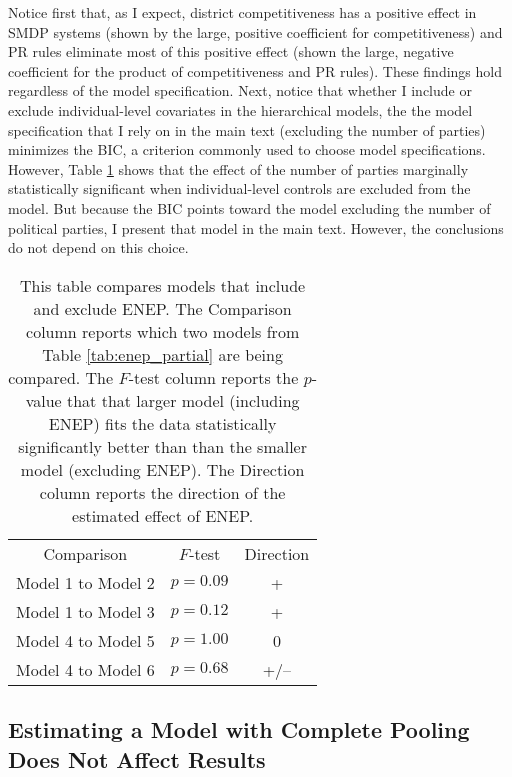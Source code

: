 \documentclass[12pt]{article}
\begin{document}
\begin{appendix}
Notice first that, as I expect, district competitiveness has a positive effect in SMDP systems (shown by the large, positive coefficient for competitiveness) and PR rules eliminate most of this positive effect (shown the large, negative coefficient for the product of competitiveness and PR rules). These findings hold regardless of the model specification. Next, notice that whether I include or exclude individual-level covariates in the hierarchical  models, the the model specification that I rely on in the main text (excluding the number of parties) minimizes the BIC, a criterion commonly used to choose model specifications. However, Table \ref{tab:F_partial} shows that the effect of the number of parties marginally statistically significant when individual-level controls are excluded from the model. But because the BIC points toward the model excluding the number of political parties, I present that model in the main text. However, the conclusions do not depend on this choice.



 
 \begin{table}[h!]
 \begin{center}
 \begin{tabular}{c c c}
 Comparison & $F$-test & Direction \\
 Model 1 to Model 2 & $p = 0.09$ & + \\
 Model 1 to Model 3 & $p = 0.12$ & + \\
 Model 4 to Model 5 & $p = 1.00$ & 0 \\
 Model 4 to Model 6 & $p = 0.68$ & +/-- \\
 \end{tabular} \caption{This table compares models that include and exclude ENEP. The Comparison column reports which two models from Table \ref{tab:enep_partial} are being compared. The $F$-test column reports the $p$-value that that larger model (including ENEP) fits the data statistically significantly better than than the smaller model (excluding ENEP). The Direction column reports the direction of the estimated effect of ENEP.}\label{tab:F_partial}
 \end{center}
 \end{table}
 
\clearpage
\subsection{Estimating a Model with Complete Pooling Does Not Affect Results}


\end{appendix}
\end{document}

